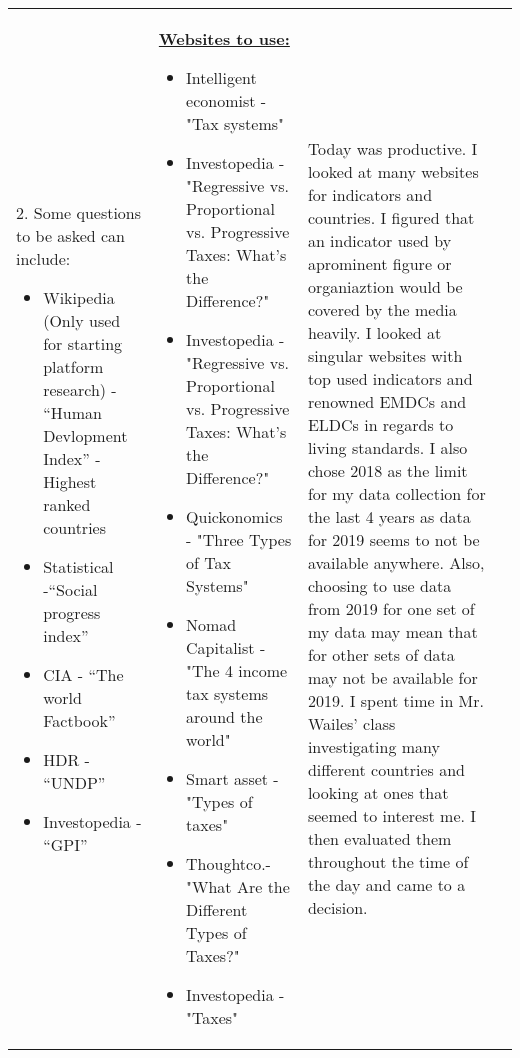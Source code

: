 \documentclass[11pt, a4paper]{article}
\begin{document}
\begin{landscape}
\begin{longtable}{|m{2.5cm}|m{6.6cm}|m{6.6cm}|m{9.41cm}|}
			 	
			 	2. Some questions to be asked can include:
				 
				 
			 	\begin{itemize}
					 \item Wikipedia (Only used for starting platform research) - ``Human Devlopment Index'' - Highest ranked countries
					 \item Statistical -``Social progress index''
					 \item CIA - ``The world Factbook''
					 \item HDR - ``UNDP''
					 \item Investopedia - ``GPI''
			 	\end{itemize}
		 	
			  	& 
		 	
				\textbf{\underline{Websites to use:}}
				\newline
			
				\begin{itemize}
					\item Intelligent economist - "Tax systems"
					\item Investopedia - "Regressive vs. Proportional vs. Progressive Taxes: What's the Difference?"
					\item Investopedia - "Regressive vs. Proportional vs. Progressive Taxes: What's the Difference?"
					\item Quickonomics - "Three Types of Tax Systems"
					\item Nomad Capitalist -"The 4 income tax systems around the world"
					\item Smart asset - "Types of taxes"
					\item Thoughtco.- "What Are the Different Types of Taxes?"
					\item Investopedia - "Taxes"
				\end{itemize}
				
				&
				Today was productive. I looked at many websites for indicators and countries. I figured that an indicator used by aprominent figure or organiaztion would be covered by the media heavily. I looked at singular websites with top used indicators and renowned EMDCs and ELDCs in regards to living standards. I also chose 2018 as the limit for my data collection for the last 4 years as data for 2019 seems to not be available anywhere. Also, choosing to use data from 2019 for one set of my data may mean that for other sets of data may not be available for 2019. I spent time in Mr. Wailes’ class investigating many different countries and looking at ones that seemed to interest me. I then evaluated them throughout the time of the day and came to a decision.


\end{longtable}
\end{landscape}
\end{document}

